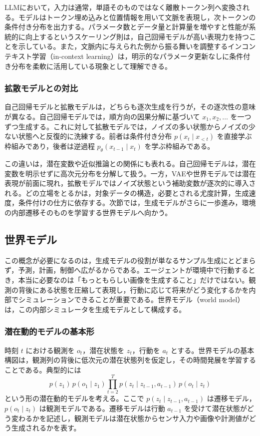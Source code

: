 LLMにおいて，入力は通常，単語そのものではなく離散トークン列へ変換される。モデルはトークン埋め込みと位置情報を用いて文脈を表現し，次トークンの条件付き分布を出力する。パラメータ数とデータ量と計算量を増やすと性能が系統的に向上するというスケーリング則\cite{Kaplan2020}は，自己回帰モデルが高い表現力を持つことを示している。また，文脈内に与えられた例から振る舞いを調整するインコンテキスト学習（in-context learning）は，明示的なパラメータ更新なしに条件付き分布を柔軟に活用している現象として理解できる。

\subsubsection{拡散モデルとの対比}

自己回帰モデルと拡散モデルは，どちらも逐次生成を行うが，その逐次性の意味が異なる。自己回帰モデルでは，順方向の因果分解に基づいて \(x_1,x_2,\dots\) を一つずつ生成する。これに対して拡散モデルでは，ノイズの多い状態からノイズの少ない状態へと反復的に洗練する。前者は条件付き分布 \(p(x_t \mid x_{<t})\) を直接学ぶ枠組みであり，後者は逆過程 \(p_{\theta}(x_{t-1}\mid x_t)\) を学ぶ枠組みである。

この違いは，潜在変数や近似推論との関係にも表れる。自己回帰モデルは，潜在変数を明示せずに高次元分布を分解して扱う。一方，VAEや世界モデルでは潜在表現が前面に現れ，拡散モデルではノイズ状態という補助変数が逐次的に導入される。どの立場をとるかは，対象データの構造，必要とされる尤度計算，生成速度，条件付けの仕方に依存する。次節では，生成モデルがさらに一歩進み，環境の内部遷移そのものを学習する世界モデルへ向かう。

\subsection{世界モデル}

この概念が必要になるのは，生成モデルの役割が単なるサンプル生成にとどまらず，予測，計画，制御へ広がるからである。エージェントが環境中で行動するとき，本当に必要なのは「もっともらしい画像を生成すること」だけではない。観測の背後にある状態を圧縮して表現し，行動に応じて将来がどう変化するかを内部でシミュレーションできることが重要である。世界モデル（world model）は，この内部シミュレータを生成モデルとして構成する。

\subsubsection{潜在動的モデルの基本形}

時刻 \(t\) における観測を \(o_t\)，潜在状態を \(z_t\)，行動を \(a_t\) とする。世界モデルの基本構図は，観測列の背後に低次元の潜在状態列を仮定し，その時間発展を学習することである。典型的には
\begin{equation}
p(z_1)\,p(o_1 \mid z_1)\prod_{t=2}^{T} p(z_t \mid z_{t-1},a_{t-1})\,p(o_t \mid z_t)
\end{equation}
という形の潜在動的モデルを考える。ここで \(p(z_t \mid z_{t-1},a_{t-1})\) は遷移モデル，\(p(o_t \mid z_t)\) は観測モデルである。遷移モデルは行動 \(a_{t-1}\) を受けて潜在状態がどう変わるかを記述し，観測モデルは潜在状態からセンサ入力や画像や計測値がどう生成されるかを表す。

